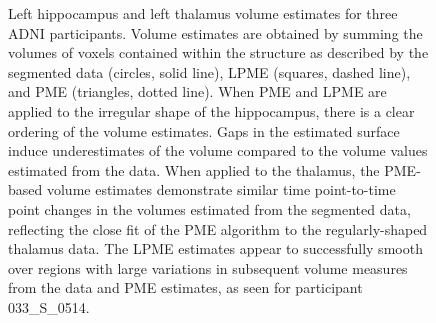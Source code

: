 \documentclass[12pt]{article}
\begin{document}
\begin{figure}
    \centering
    \vfill
    \caption{Left hippocampus and left thalamus volume estimates for three ADNI participants. Volume estimates are obtained by summing the volumes of voxels contained within the structure as described by the segmented data (circles, solid line), LPME (squares, dashed line), and PME (triangles, dotted line). When PME and LPME are applied to the irregular shape of the hippocampus, there is a clear ordering of the volume estimates. Gaps in the estimated surface induce underestimates of the volume compared to the volume values estimated from the data. When applied to the thalamus, the PME-based volume estimates demonstrate similar time point-to-time point changes in the volumes estimated from the segmented data, reflecting the close fit of the PME algorithm to the regularly-shaped thalamus data. The LPME estimates appear to successfully smooth over regions with large variations in subsequent volume measures from the data and PME estimates, as seen for participant 033\_S\_0514.}
\end{figure}
\end{document}
